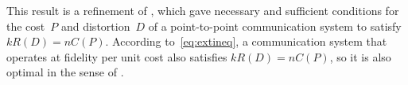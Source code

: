 This result is a refinement of , which gave
necessary and sufficient conditions for the cost~$P$ and distortion~$D$ of a
point-to-point communication system to satisfy $k R(D) = n C(P)$. According
to~\eqref{eq:extineq}, a communication system that operates at fidelity per unit
cost also satisfies $k R(D) = n C(P)$, so it is also optimal in the sense of
.
